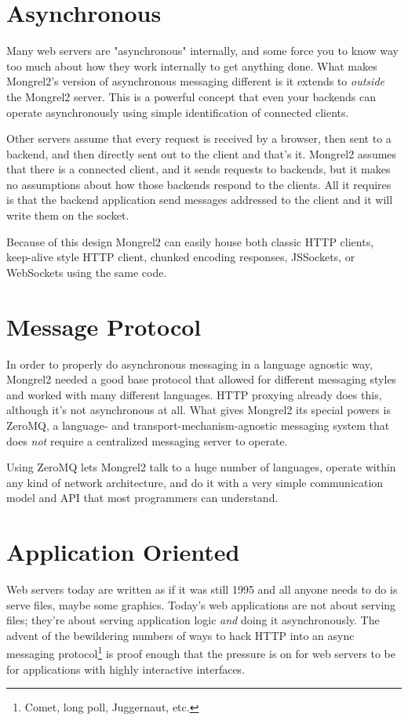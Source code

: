 \section{Asynchronous}

Many web servers are "asynchronous" internally, and some force you to
know way too much about how they work internally to get anything done.  What makes
Mongrel2's version of asynchronous messaging different is it extends to
\emph{outside} the Mongrel2 server.  This is a powerful concept that even your backends
can operate asynchronously using simple identification of connected clients.

Other servers assume that every request is received by a browser, then sent to a backend,
and then directly sent out to the client and that's it.  Mongrel2 assumes that there
is a connected client, and it sends requests to backends, but it makes no assumptions
about how those backends respond to the clients.  All it requires is that the backend
application send messages addressed to the client and it will write them on the
socket.

Because of this design Mongrel2 can easily house both classic HTTP clients, keep-alive
style HTTP client, chunked encoding responses, JSSockets, or WebSockets using the same
code.


\section{Message Protocol}

In order to properly do asynchronous messaging in a language agnostic way, Mongrel2
needed a good base protocol that allowed for different messaging styles and worked
with many different languages.  HTTP proxying already does this, although it's not
asynchronous at all.  What gives Mongrel2 its special powers is ZeroMQ, a language-
and transport-mechanism-agnostic messaging system that does \emph{not} require a
centralized messaging server to operate.

Using ZeroMQ lets Mongrel2 talk to a huge number of languages, operate within any
kind of network architecture, and do it with a very simple communication model and
API that most programmers can understand.


\section{Application Oriented}

Web servers today are written as if it was still 1995 and all anyone needs to do
is serve files, maybe some graphics.  Today's web applications are not about serving
files; they're about serving application logic \emph{and} doing it asynchronously.
The advent of the bewildering numbers of ways to hack HTTP into an async messaging
protocol\footnote{Comet, long poll, Juggernaut, etc.} is proof enough that the
pressure is on for web servers to be for applications with highly interactive
interfaces.

